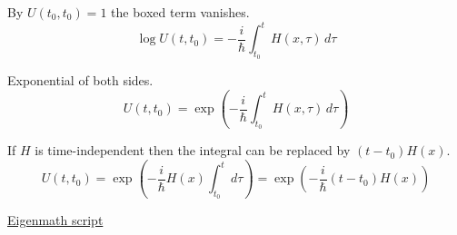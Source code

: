 By $U(t_0,t_0)=1$ the boxed term vanishes.
\begin{equation*}
\log U(t,t_0)=-\frac{i}{\hbar}\int_{t_0}^t H(x,\tau)\,d\tau
\end{equation*}

Exponential of both sides.
\begin{equation*}
U(t,t_0)=\exp\left(-\frac{i}{\hbar}\int_{t_0}^t H(x,\tau)\,d\tau\right)
\tag{1}
\end{equation*}

If $H$ is time-independent then the integral can be replaced by $(t-t_0)H(x)$.
\begin{equation*}
U(t,t_0)=\exp\left(-\frac{i}{\hbar}H(x)\int_{t_0}^td\tau\right)
=\exp\left(-\frac{i}{\hbar}(t-t_0)H(x)\right)
\end{equation*}

\href{https://georgeweigt.github.io/examples/time-evolution-operator-demo.html}{Eigenmath script}


